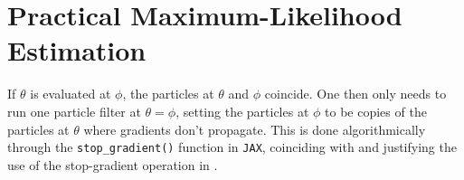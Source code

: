 \documentclass[numsec,webpdf,modern,medium,namedate]{oup-authoring-template}
\newcommand\arxiv[2]{#2} %
\theoremstyle{thmstyleone}%
\theoremstyle{thmstyletwo}%
\theoremstyle{thmstylethree}%
\begin{document}




\section{Practical Maximum-Likelihood Estimation}


If $\theta$ is evaluated at $\phi$, the particles at $\theta$ and $\phi$ coincide. One then only needs to run one particle filter at $\theta=\phi$, setting the particles at $\phi$ to be copies of the particles at $\theta$ where gradients don't propagate. This is done algorithmically through the \texttt{stop\_gradient()} function in \texttt{JAX}, coinciding with and justifying the use of the stop-gradient operation in \cite{scibior21}.
\end{document}
